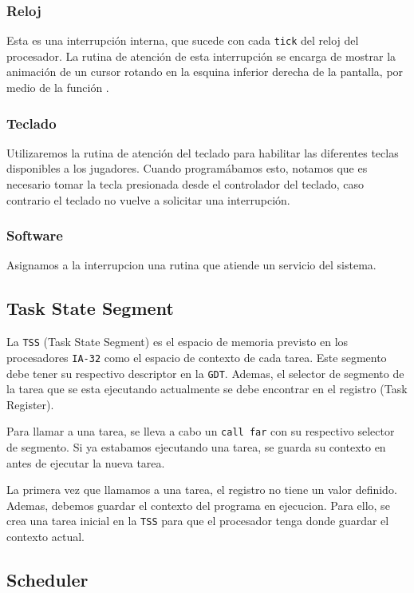 \subsubsection{Reloj}

Esta es una interrupción interna, que sucede con cada \texttt{tick} del reloj del procesador. La rutina de atención de esta interrupción se encarga de mostrar la animación de un cursor rotando en la esquina inferior derecha de la pantalla, por medio de la función .

\subsubsection{Teclado}
Utilizaremos la rutina de atención del teclado para habilitar las diferentes teclas disponibles a los jugadores. Cuando programábamos esto, notamos que es necesario tomar la tecla presionada desde el controlador del teclado, caso contrario el teclado no vuelve a solicitar una interrupción.

\subsubsection{Software}
Asignamos a la interrupcion  una rutina que atiende un servicio del sistema.

\subsection{Task State Segment}

La \texttt{TSS} (Task State Segment) es el espacio de memoria previsto en los procesadores \texttt{IA-32} como el espacio de contexto de cada tarea. Este segmento debe tener su respectivo descriptor en la \texttt{GDT}. Ademas, el selector de segmento de la tarea que se
esta ejecutando actualmente se debe encontrar en el registro  (Task Register).

Para llamar a una tarea, se lleva a cabo un \texttt{call far} con su respectivo selector de segmento. Si ya estabamos ejecutando una tarea, se guarda su contexto en  antes de ejecutar la nueva tarea. 

La primera vez que llamamos a una tarea, el registro  no tiene un valor definido. Ademas, debemos guardar el contexto del programa en ejecucion. Para ello, se crea una tarea inicial  en la \texttt{TSS} para que el procesador tenga donde guardar el contexto actual.

\subsection{Scheduler}